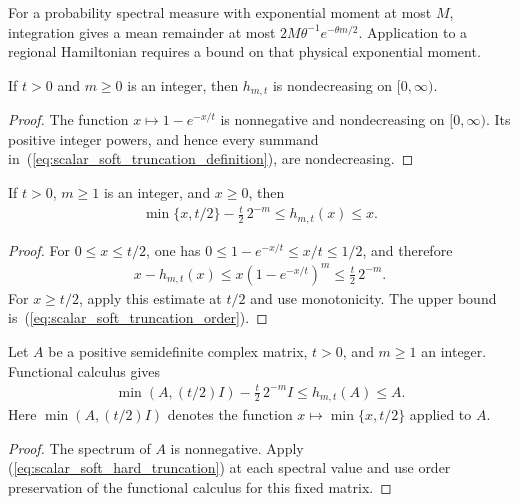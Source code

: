 For a probability spectral measure with exponential moment at most $M$,
integration gives a mean remainder at most
$2M\theta^{-1}e^{-\theta m/2}$. Application to a regional Hamiltonian
requires a bound on that physical exponential moment.


\begin{lemma}
    \label{thm:scalar_soft_truncation_monotone}
    \leanok
    If $t>0$ and $m\geq0$ is an integer, then $h_{m,t}$ is nondecreasing
    on $[0,\infty)$.
\end{lemma}
\begin{proof}\leanok
    The function $x\mapsto 1-e^{-x/t}$ is nonnegative and nondecreasing on
    $[0,\infty)$. Its positive integer powers, and hence every summand
    in~(\ref{eq:scalar_soft_truncation_definition}), are nondecreasing.
\end{proof}

\begin{lemma}
    \label{thm:scalar_soft_hard_truncation}
    \leanok
    If $t>0$, $m\geq1$ is an integer, and $x\geq0$, then
    \begin{align}
        \min\{x,t/2\}-\frac{t}{2}\,2^{-m}
        \leq h_{m,t}(x)\leq x.
        \label{eq:scalar_soft_hard_truncation}
    \end{align}
\end{lemma}
\begin{proof}\leanok
    For $0\leq x\leq t/2$, one has
    $0\leq1-e^{-x/t}\leq x/t\leq1/2$, and therefore
    \begin{align}
        x-h_{m,t}(x)
        \leq x(1-e^{-x/t})^m\leq\frac{t}{2}\,2^{-m}.
    \end{align}
    For $x\geq t/2$, apply this estimate at $t/2$ and use monotonicity.
    The upper bound is~(\ref{eq:scalar_soft_truncation_order}).
\end{proof}

\begin{lemma}
    \label{thm:matrix_soft_hard_truncation}
    \leanok
    Let $A$ be a positive semidefinite complex matrix, $t>0$, and $m\geq1$
    an integer. Functional calculus gives
    \begin{align}
        \min(A,(t/2)I)-\frac{t}{2}\,2^{-m}I
        \leq h_{m,t}(A)\leq A.
        \label{eq:matrix_soft_hard_truncation}
    \end{align}
    Here $\min(A,(t/2)I)$ denotes the function $x\mapsto\min\{x,t/2\}$
    applied to $A$.
\end{lemma}
\begin{proof}\leanok
    The spectrum of $A$ is nonnegative. Apply
    (\ref{eq:scalar_soft_hard_truncation}) at each spectral value and use
    order preservation of the functional calculus for this fixed matrix.
\end{proof}


